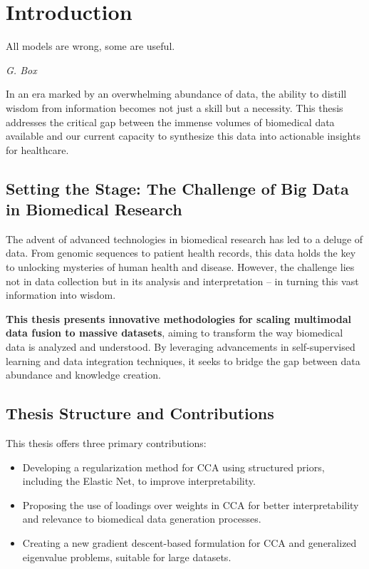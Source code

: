 \graphicspath{{chapters/introduction/}}
\chapter{Introduction}\label{chap:introduction}

 \epigraph{All models are wrong, some are useful.}{\textit{G. Box}}

In an era marked by an overwhelming abundance of data, the ability to distill wisdom from information becomes not just a skill but a necessity.
This thesis addresses the critical gap between the immense volumes of biomedical data available and our current capacity to synthesize this data into actionable insights for healthcare.

\section{Setting the Stage: The Challenge of Big Data in Biomedical Research}

The advent of advanced technologies in biomedical research has led to a deluge of data.
From genomic sequences to patient health records, this data holds the key to unlocking mysteries of human health and disease.
However, the challenge lies not in data collection but in its analysis and interpretation – in turning this vast information into wisdom.

\textbf{This thesis presents innovative methodologies for scaling multimodal data fusion to massive datasets}, aiming to transform the way biomedical data is analyzed and understood.
By leveraging advancements in self-supervised learning and data integration techniques, it seeks to bridge the gap between data abundance and knowledge creation.

\section{Thesis Structure and Contributions}

This thesis offers three primary contributions:

\begin{itemize}
    \item Developing a regularization method for CCA using structured priors, including the Elastic Net, to improve interpretability.
    \item Proposing the use of loadings over weights in CCA for better interpretability and relevance to biomedical data generation processes.
    \item Creating a new gradient descent-based formulation for CCA and generalized eigenvalue problems, suitable for large datasets.
\end{itemize}


